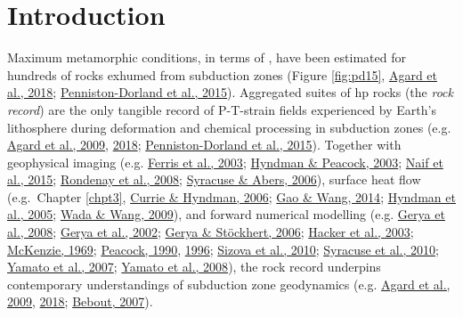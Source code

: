 \hypertarget{chpt4Intro}{%
\section{Introduction}\label{chpt4Intro}}

Maximum metamorphic conditions, in terms of , have been estimated for hundreds of  rocks exhumed from subduction zones (Figure \ref{fig:pd15}, \protect\hyperlink{ref-agard2018}{Agard et al., 2018}; \protect\hyperlink{ref-penniston2015}{Penniston-Dorland et al., 2015}). Aggregated suites of \gls{hp} rocks (the \emph{rock record}) are the only tangible record of P-T-strain fields experienced by Earth's lithosphere during deformation and chemical processing in subduction zones (e.g. \protect\hyperlink{ref-agard2009}{Agard et al., 2009}, \protect\hyperlink{ref-agard2018}{2018}; \protect\hyperlink{ref-penniston2015}{Penniston-Dorland et al., 2015}). Together with geophysical imaging (e.g. \protect\hyperlink{ref-ferris2003}{Ferris et al., 2003}; \protect\hyperlink{ref-hyndman2003}{Hyndman \& Peacock, 2003}; \protect\hyperlink{ref-naif2015}{Naif et al., 2015}; \protect\hyperlink{ref-rondenay2008}{Rondenay et al., 2008}; \protect\hyperlink{ref-syracuse2006}{Syracuse \& Abers, 2006}), surface heat flow (e.g.~Chapter \ref{chpt3}, \protect\hyperlink{ref-currie2006}{Currie \& Hyndman, 2006}; \protect\hyperlink{ref-gao2014}{Gao \& Wang, 2014}; \protect\hyperlink{ref-hyndman2005}{Hyndman et al., 2005}; \protect\hyperlink{ref-wada2009}{Wada \& Wang, 2009}), and forward numerical modelling (e.g. \protect\hyperlink{ref-gerya2008}{Gerya et al., 2008}; \protect\hyperlink{ref-gerya2002}{Gerya et al., 2002}; \protect\hyperlink{ref-gerya2006}{Gerya \& Stöckhert, 2006}; \protect\hyperlink{ref-hacker2003}{Hacker et al., 2003}; \protect\hyperlink{ref-mckenzie1969}{McKenzie, 1969}; \protect\hyperlink{ref-peacock1990}{Peacock, 1990}, \protect\hyperlink{ref-peacock1996}{1996}; \protect\hyperlink{ref-sizova2010}{Sizova et al., 2010}; \protect\hyperlink{ref-syracuse2010}{Syracuse et al., 2010}; \protect\hyperlink{ref-yamato2007}{Yamato et al., 2007}; \protect\hyperlink{ref-yamato2008}{Yamato et al., 2008}), the rock record underpins contemporary understandings of subduction zone geodynamics (e.g. \protect\hyperlink{ref-agard2009}{Agard et al., 2009}, \protect\hyperlink{ref-agard2018}{2018}; \protect\hyperlink{ref-bebout2007}{Bebout, 2007}).

